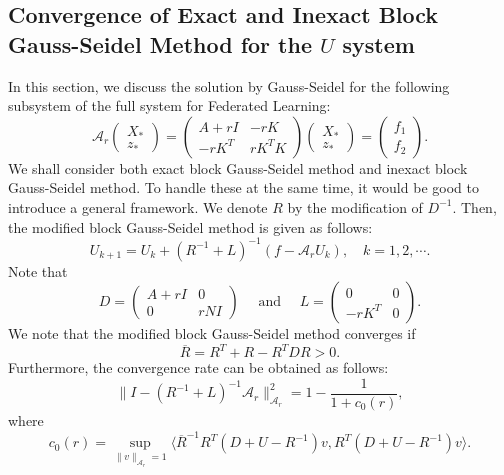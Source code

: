 \documentclass{article}
\theoremstyle{definition}
\begin{document}
\subsection{Convergence of Exact and Inexact Block Gauss-Seidel Method for the $U$ system}
In this section, we discuss the solution by Gauss-Seidel for the following subsystem of the full system for Federated Learning: 
\begin{equation}
\mathcal{A}_r \begin{pmatrix} X_* \\ z_* \end{pmatrix} = \begin{pmatrix} 
A + rI & - r K \\ - r K^T & r K^T K   
\end{pmatrix} \begin{pmatrix} X_* \\ z_* \end{pmatrix} = \begin{pmatrix} f_1 \\ f_2 \end{pmatrix}. 
\end{equation} 
We shall consider both exact block Gauss-Seidel method and inexact block Gauss-Seidel method. To handle these at the same time, it would be good to introduce a general framework. We denote $R$ by the modification of $D^{-1}$. Then, the modified block Gauss-Seidel method is given as follows: 
\begin{equation}\label{gsmethod} 
U_{k+1} = U_k + (R^{-1} + L)^{-1} (f - \mathcal{A}_r U_{k}), \quad k = 1,2,\cdots. 
\end{equation}
Note that 
\begin{equation} 
D = \begin{pmatrix} A + r I & 0 \\ 0 & rN I \end{pmatrix} \quad \mbox{ and } \quad L = \begin{pmatrix} 0 & 0 \\ -r K^T & 0 \end{pmatrix}. 
\end{equation} 
We note that the modified block Gauss-Seidel method converges if 
\begin{equation}
\overline{R} = R^T + R - R^T D R > 0. 
\end{equation} 
Furthermore, the convergence rate can be obtained as follows: 
\begin{equation}
\|I - (R^{-1} + L)^{-1} \mathcal{A}_r\|_{\mathcal{A}_r}^2 = 1 - \frac{1}{1 + c_0(r)}, 
\end{equation} 
where 
\begin{equation}
c_0(r) = \sup_{\|v\|_{\mathcal{A}_r}=1} \langle \overline{R}^{-1} R^T ( D+ U - R^{-1}) v, R^T (D + U - R^{-1}) v \rangle. 
\end{equation}
\end{document}
